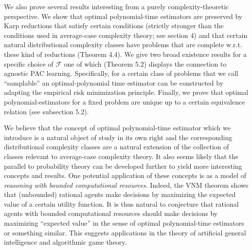 \documentclass{article}
\numberwithin{equation}{section}
\theoremstyle{definition}
\theoremstyle{plain}
\newcommand{\Fall}{\mathcal{F}}
\begin{document}
We also prove several results interesting from a purely complexity-theoretic perspective. We show that optimal polynomial-time estimators are preserved by Karp reductions that satisfy certain conditions (strictly stronger than the conditions used in average-case complexity theory; see section 4) and that certain natural distributional complexity classes have problems that are complete w.r.t. these kind of reductions (Theorem 4.4). We give two broad existence results for a specific choice of ${\Fall}$ one of which (Theorem 5.2) displays the connection to agnostic PAC learning. Specifically, for a certain class of problems that we call \enquote{samplable} an optimal-polynomial time estimator can be constructed by adapting the empirical risk minimization principle\cite{Shalev-Shwartz_2014}. Finally, we prove that optimal polynomial-estimators for a fixed problem are unique up to a certain equivalence relation (see subsection 5.2).

We believe that the concept of optimal polynomial-time estimator which we introduce is a natural object of study in its own right and the corresponding distributional complexity classes are a natural extension of the collection of classes relevant to average-case complexity theory. It also seems likely that the parallel to probability theory can be developed further to yield more interesting concepts and results. One potential application of these concepts is as a model of \emph{reasoning with bounded computational resources}. Indeed, the VNM theorem shows that (unbounded) rational agents make decisions by maximizing the expected value of a certain utility function. It is thus natural to conjecture that rational agents with bounded computational resources should make decisions by maximizing \enquote{expected value} in the sense of optimal polynomial-time estimators or something similar. This suggests applications in the theory of artificial general intelligence and algorithmic game theory.



\end{document}
